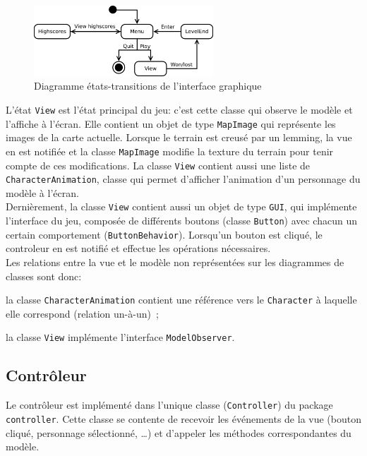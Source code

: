 \documentclass[a4paper,12pt]{article}
\begin{document}
\begin{figure}[ht!]
  \centerline{
  \includegraphics[width=0.6\textwidth]{state.png}}
  \caption{Diagramme états-transitions de l'interface graphique}
  \label{fig:Etats}
\end{figure}

L'état \texttt{View} est l'état principal du jeu: c'est cette classe
qui observe le modèle et l'affiche à l'écran. Elle contient un objet
de type \texttt{MapImage} qui représente les images de la carte
actuelle. Lorsque le terrain est creusé par un lemming, la vue en est
notifiée et la classe \texttt{MapImage} modifie la texture du terrain
pour tenir compte de ces modifications. La classe \texttt{View}
contient aussi une liste de \texttt{CharacterAnimation}, classe qui
permet d'afficher l'animation d'un personnage du modèle à l'écran.\\

Dernièrement, la classe \texttt{View} contient aussi un objet de type
\texttt{GUI}, qui implémente l'interface du jeu, composée de
différents boutons (classe \texttt{Button}) avec chacun un certain
comportement (\texttt{ButtonBehavior}). Lorsqu'un bouton est cliqué,
le controleur en est notifié et effectue les opérations nécessaires.\\

Les relations entre la vue et le modèle non représentées sur les
diagrammes de classes sont donc:
\begin{list}{-}{}
  \item la classe \texttt{CharacterAnimation} contient une référence
    vers le \texttt{Character} à laquelle elle correspond (relation
    un-à-un)~;
  \item la classe \texttt{View} implémente l'interface
    \texttt{ModelObserver}.
\end{list}

\subsection{Contrôleur}
Le contrôleur est implémenté dans l'unique classe
(\texttt{Controller}) du package \texttt{controller}. Cette
classe se contente de recevoir les événements de la vue
(bouton cliqué, personnage sélectionné, \dots) et d'appeler
les méthodes correspondantes du modèle.
\end{document}
